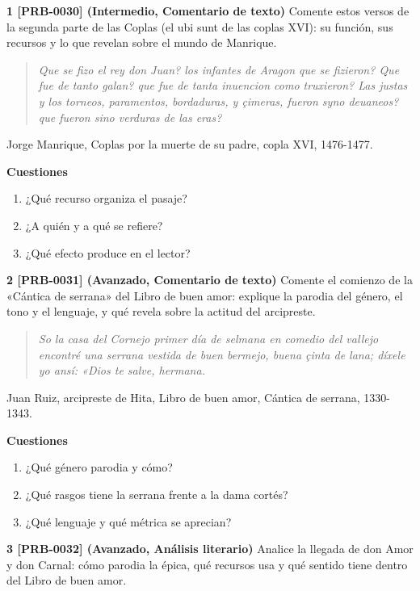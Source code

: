 \documentclass{book}
\begin{document}
\begin{tcolorbox}[title={Ejercicios}, studiumworked, breakable]

\noindent\textbf{1 [PRB-0030] (Intermedio, Comentario de texto)}
Comente estos versos de la segunda parte de las Coplas (el ubi sunt de las coplas XVI): su función, sus recursos y lo que revelan sobre el mundo de Manrique.


\begin{quote}
\itshape Que se fizo el rey don Juan? los infantes de Aragon que se fizieron? Que fue de tanto galan? que fue de tanta inuencion como truxieron? Las justas y los torneos, paramentos, bordaduras, y çimeras, fueron syno deuaneos? que fueron sino verduras de las eras?
\end{quote}
{\noindent\footnotesize Jorge Manrique, Coplas por la muerte de su padre, copla XVI, 1476-1477.\par}

\noindent\textbf{Cuestiones}
\begin{enumerate}
\item ¿Qué recurso organiza el pasaje?
\item ¿A quién y a qué se refiere?
\item ¿Qué efecto produce en el lector?
\end{enumerate}

\noindent\textbf{2 [PRB-0031] (Avanzado, Comentario de texto)}
Comente el comienzo de la «Cántica de serrana» del Libro de buen amor: explique la parodia del género, el tono y el lenguaje, y qué revela sobre la actitud del arcipreste.


\begin{quote}
\itshape So la casa del Cornejo primer día de selmana en comedio del vallejo encontré una serrana vestida de buen bermejo, buena çinta de lana; díxele yo ansí: «Dios te salve, hermana.
\end{quote}
{\noindent\footnotesize Juan Ruiz, arcipreste de Hita, Libro de buen amor, Cántica de serrana, 1330-1343.\par}

\noindent\textbf{Cuestiones}
\begin{enumerate}
\item ¿Qué género parodia y cómo?
\item ¿Qué rasgos tiene la serrana frente a la dama cortés?
\item ¿Qué lenguaje y qué métrica se aprecian?
\end{enumerate}

\noindent\textbf{3 [PRB-0032] (Avanzado, Análisis literario)}
Analice la llegada de don Amor y don Carnal: cómo parodia la épica, qué recursos usa y qué sentido tiene dentro del Libro de buen amor.



\end{tcolorbox}
\end{document}
